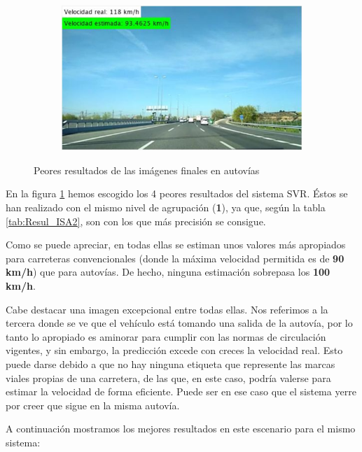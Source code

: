 \begin{figure}[H]
\begin{subfigure}[b]{0.45\linewidth}
  \end{subfigure}
  \begin{subfigure}[b]{0.45\linewidth}
    \includegraphics[width=\linewidth]{Figuras/Resultado_SVR_Autovia_MAL_4.eps}
  \end{subfigure}
  \caption{Peores resultados de las imágenes finales en autovías}  
  \label{fig:SVR_Autovia_MAL}
\end{figure}

En la figura \ref{fig:SVR_Autovia_MAL} hemos escogido los 4 peores resultados del sistema \ac{SVR}. Éstos se han realizado con el mismo nivel de agrupación (\textbf{1}), ya que, según la tabla \ref{tab:Resul_ISA2}, son con los que más precisión se consigue.

Como se puede apreciar, en todas ellas se estiman unos valores más apropiados para carreteras convencionales (donde la máxima velocidad permitida es de \textbf{90 km/h}) que para autovías. De hecho, ninguna estimación sobrepasa los \textbf{100 km/h}.

Cabe destacar una imagen excepcional entre todas ellas. Nos referimos a la tercera donde se ve que el vehículo está tomando una salida de la autovía, por lo tanto lo apropiado es aminorar para cumplir con las normas de circulación vigentes, y sin embargo, la predicción excede con creces la velocidad real. Esto puede darse debido a que no hay ninguna etiqueta que represente las marcas viales propias de una carretera, de las que, en este caso, podría valerse para estimar la velocidad de forma eficiente. Puede ser en ese caso que el sistema yerre por creer que sigue en la misma autovía.

A continuación mostramos los mejores resultados en este escenario para el mismo sistema:

